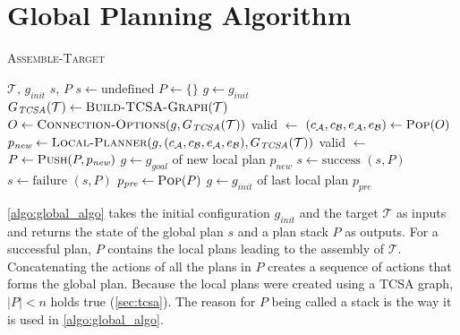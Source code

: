 \newpage

\section{Global Planning Algorithm}
\label{sec:global_algo}

\begin{algorithm}
	\caption{\scshape Assemble-Target}
	\label{algo:global_algo}
	\begin{algorithmic}[1]
		\REQUIRE $\mathcal{T}$, $g_\textit{init}$ 
		\ENSURE $s$, $P$ 
		\STATE $s \gets \text{undefined}$
		\STATE $P \gets \{\}$ 
		\STATE $g \gets g_\textit{init}$ 
		\STATE $G_{\textit{TCSA}}(\mathcal{T}) \gets \text{\scshape Build-TCSA-Graph}(\mathcal{T})$
		\LOOP
			\STATE $O \gets \text{\scshape Connection-Options}(g, G_{\textit{TCSA}}(\mathcal{T}))$
			\STATE valid $\gets$ \FALSE
				\STATE $(c_\mathcal{A}, c_\mathcal{B}, e_\mathcal{A}, e_\mathcal{B}) \gets \text{\scshape Pop}(O)$
				\STATE $p_\textit{new} \gets \text{\scshape Local-Planner}(g, (c_\mathcal{A}, c_\mathcal{B}, e_\mathcal{A}, e_\mathcal{B}), G_{\textit{TCSA}}(\mathcal{T}))$
					\STATE valid $\gets$ \TRUE
				\ENDIF
			\ENDWHILE
				\STATE $P \gets \text{\scshape Push}(P, p_\textit{new})$ 
				\STATE $g \gets g_\textit{goal}$ of new local plan $p_\textit{new}$ 
					\STATE $s \gets \text{success}$
					\RETURN $(s, P)$
				\ENDIF
			\ELSE
					\STATE $s \gets \text{failure}$
					\RETURN $(s, P)$
				\ENDIF
				\STATE $p_\textit{pre} \gets \text{\scshape Pop}(P)$ 
				\STATE $g \gets g_\textit{init}$ of last local plan $p_\textit{pre}$ 
			\ENDIF
		\ENDLOOP
	\end{algorithmic}
\end{algorithm}

\autoref{algo:global_algo} takes the initial configuration $g_\textit{init}$ and the target $\mathcal{T}$ as inputs and returns the state of the global plan $s$ and a plan stack $P$ as outputs.
For a successful plan, $P$ contains the local plans leading to the assembly of $\mathcal{T}$.
Concatenating the actions of all the plans in $P$ creates a sequence of actions that forms the global plan.
Because the local plans were created using a TCSA graph, $|P| < n$ holds true (\autoref{sec:tcsa}).
The reason for $P$ being called a stack is the way it is used in \autoref{algo:global_algo}.

